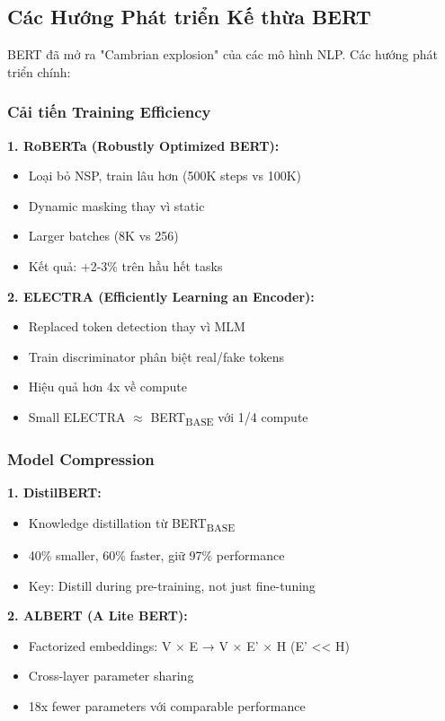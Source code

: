 \subsection{Các Hướng Phát triển Kế thừa BERT}
\label{ssec:huong_phat_trien_ke_thua}
BERT đã mở ra "Cambrian explosion" của các mô hình NLP. Các hướng phát triển chính:

\subsubsection{Cải tiến Training Efficiency}

\textbf{1. RoBERTa (Robustly Optimized BERT):}
\begin{itemize}
    \item Loại bỏ NSP, train lâu hơn (500K steps vs 100K)
    \item Dynamic masking thay vì static
    \item Larger batches (8K vs 256)
    \item Kết quả: +2-3\% trên hầu hết tasks
\end{itemize}

\textbf{2. ELECTRA (Efficiently Learning an Encoder):}
\begin{itemize}
    \item Replaced token detection thay vì MLM
    \item Train discriminator phân biệt real/fake tokens
    \item Hiệu quả hơn 4x về compute
    \item Small ELECTRA $\approx$ BERT\textsubscript{BASE} với 1/4 compute
\end{itemize}

\subsubsection{Model Compression}

\textbf{1. DistilBERT:}
\begin{itemize}
    \item Knowledge distillation từ BERT\textsubscript{BASE}
    \item 40\% smaller, 60\% faster, giữ 97\% performance
    \item Key: Distill during pre-training, not just fine-tuning
\end{itemize}

\textbf{2. ALBERT (A Lite BERT):}
\begin{itemize}
    \item Factorized embeddings: V × E → V × E' × H (E' << H)
    \item Cross-layer parameter sharing
    \item 18x fewer parameters với comparable performance
\end{itemize}


